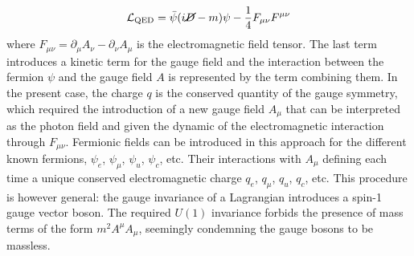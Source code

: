 \begin{equation}
    \mathcal{L}_{\text{QED}} = \bar{\psi} (i \cancel{D}- m) \psi - \frac{1}{4} F_{\mu\nu} F^{\mu\nu}
\end{equation}
where $F_{\mu\nu} = \partial_{\mu} A_\nu - \partial_\nu A_{\mu} $ is the electromagnetic field tensor. The last term introduces a kinetic term for the gauge field and the interaction between the fermion $\psi$ and the gauge field $A$ is represented by the term combining them. In the present case, the charge $q$ is the conserved quantity of the gauge symmetry, which required the introduction of a new gauge field $A_\mu$ that can be interpreted as the photon field and given the dynamic of the electromagnetic interaction through $F_{\mu\nu}$. Fermionic fields can be introduced in this approach for the different known fermions, $\psi_e$, $\psi_{\mu}$, $\psi_u$, $\psi_c$, etc. Their interactions with $A_\mu$ defining each time a unique conserved electromagnetic charge $q_e$, $q_{\mu}$, $q_u$, $q_c$, etc.  This procedure is however general: the gauge invariance of a Lagrangian introduces a spin-1 gauge vector boson. The required $U(1)$ invariance forbids the presence of mass terms of the form $m^2 A^{\mu} A_{\mu}$, seemingly condemning the gauge bosons to be massless. 

